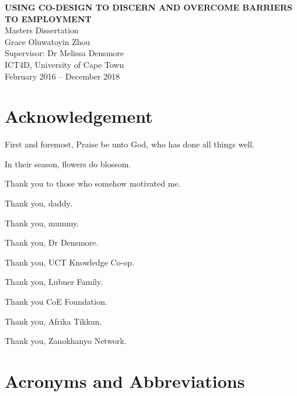 \documentclass[12pt,a4paper]{report}
\begin{document}
\begin{titlepage}
    \centering
    \vspace*{2cm}
    
    {\LARGE \textbf{USING CO-DESIGN TO DISCERN AND OVERCOME BARRIERS TO EMPLOYMENT}}\\[2cm]
    
    {\Large Masters Dissertation}\\[1.5cm]
    
    {\Large Grace Oluwatoyin Zhou}\\[1cm]
    
    Supervisor: Dr Melissa Densmore\\[0.5cm]
    ICT4D, University of Cape Town\\[0.5cm]
    February 2016 -- December 2018\\[0.5cm]
    
    \vfill
\end{titlepage}


\chapter*{Acknowledgement}

First and foremost, Praise be unto God, who has done all things well.

In their season, flowers do blossom.

Thank you to those who somehow motivated me.

Thank you, daddy.

Thank you, mummy.

Thank you, Dr Densmore.

Thank you, UCT Knowledge Co-op.

Thank you, Lubner Family.

Thank you CoE Foundation.

Thank you, Afrika Tikkun.

Thank you, Zanokhanyo Network.


\chapter*{Acronyms and Abbreviations}
\end{document}
